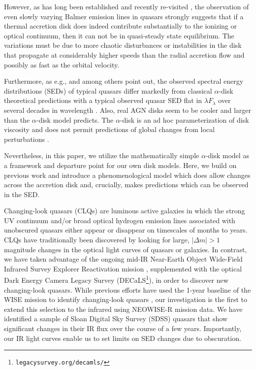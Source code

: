 \documentclass[a4paper,fleqn,usenatbib]{mnras}
\begin{document}
However, as has long been established \citep[e.g., ][]{Alloin1985} and
recently re-visited \citep[e.g., ][]{LaMassa2015, Runnoe2016,
MacLeod2016, Ruan2016, Rumbaugh2017, Yang2017, Lawrence2018}, the
observation of even slowly varying Balmer emission lines in quasars
strongly suggests that if a thermal accretion disk does indeed
contribute substantially to the ionizing or optical continuum, then it
can not be in quasi-steady state equilibrium. The variations must be
due to more chaotic disturbances or instabilities in the disk that
propagate at considerably higher speeds than the radial accretion flow
and possibly as fast as the orbital velocity.

Furthermore, as e.g., \citet{Koratkar_Blaes1999} and
\citet{Sirko_Goodman2003} among others point out, the observed
spectral energy distributions (SEDs) of typical quasars differ
markedly from classical $\alpha$-disk theoretical predictions
\citep[][]{SS73, Pringle1981} with a typical observed quasar SED flat
in $\lambda F_{\lambda}$ over several decades in wavelength
\citep{Elvis1994, Richards2006b}. Also, real AGN disks seem to be
cooler \citep[e.g., ][]{Lawrence2012} and larger
\citep[e.g.,][]{Pooley2007, Morgan2010, Morgan2012, Mosquera2011} than
the $\alpha$-disk model predicts. The $\alpha$-disk is an ad hoc
parameterization of disk viscosity and does not permit predictions of
global changes from local perturbations \citep{King2012}.

Nevertheless, in this paper, we utilize the mathematically simple
$\alpha$-disk model as a framework and departure point for our own
disk models. Here, we build on previous work \citep{Sirko_Goodman2003,
Zimmerman2005, Hameury2009} and introduce a phenomenological model
which does allow changes across the accretion disk and, crucially,
makes predictions which can be observed in the SED.

Changing-look quasars (CLQs) are luminous active galaxies in which the
strong UV continuum and/or broad optical hydrogen emission lines
associated with unobscured quasars either appear or disappear on
timescales of months to years. CLQs have traditionally been discovered
by looking for large, $| \Delta m | >1$ magnitude changes in the
optical light curves of quasars or galaxies. In contrast, we have
taken advantage of the ongoing mid-IR Near-Earth Object Wide-Field
Infrared Survey Explorer Reactivation mission \citep[NEOWISE-R;
][]{Mainzer2014}, supplemented with the optical Dark Energy Camera
Legacy Survey (DECaLS\footnote{{\tt legacysurvey.org/decamls/}}), in
order to discover new changing-look quasars.  While previous efforts
have used the 1-year baseline of the WISE mission to identify
changing-look quasars \citep[e.g.,][]{Assef2018, Stern2018}, our
investigation is the first to extend this selection to the infrared
using NEOWISE-R mission data. We have identified a sample of Sloan
Digital Sky Survey (SDSS) quasars that show significant changes in
their IR flux over the course of a few years. Importantly, our IR
light curves enable us to set limits on SED changes due to
obscuration.
\end{document}
